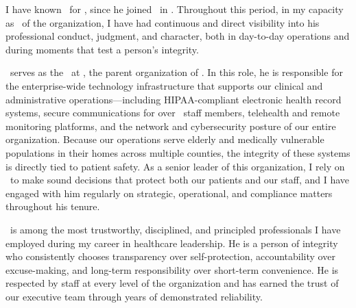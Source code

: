 \resetlicquestions

\licformheader

\licwriterinfo
  {\RefAName}
  {\RefAAddress}
  {\RefACityStateZip}
  {\RefAPhone}


I have known \ApplicantName\ for \RefAKnownDuration, since he joined \EmployerName\ in \RefAKnownSince. Throughout this period, in my capacity as \RefATitle\ of the organization, I have had continuous and direct visibility into his professional conduct, judgment, and character, both in day-to-day operations and during moments that test a person's integrity.


\ApplicantName\ serves as the \EmployerRole\ at \EmployerName, the parent organization of \EmployerDivisions. In this role, he is responsible for the enterprise-wide technology infrastructure that supports our clinical and administrative operations---including HIPAA-compliant electronic health record systems, secure communications for over \TeamSize\ staff members, telehealth and remote monitoring platforms, and the network and cybersecurity posture of our entire organization. Because our operations serve elderly and medically vulnerable populations in their homes across multiple counties, the integrity of these systems is directly tied to patient safety. As a senior leader of this organization, I rely on \ApplicantName\ to make sound decisions that protect both our patients and our staff, and I have engaged with him regularly on strategic, operational, and compliance matters throughout his tenure.


\ApplicantName\ is among the most trustworthy, disciplined, and principled professionals I have employed during my career in healthcare leadership. He is a person of integrity who consistently chooses transparency over self-protection, accountability over excuse-making, and long-term responsibility over short-term convenience. He is respected by staff at every level of the organization and has earned the trust of our executive team through years of demonstrated reliability.

